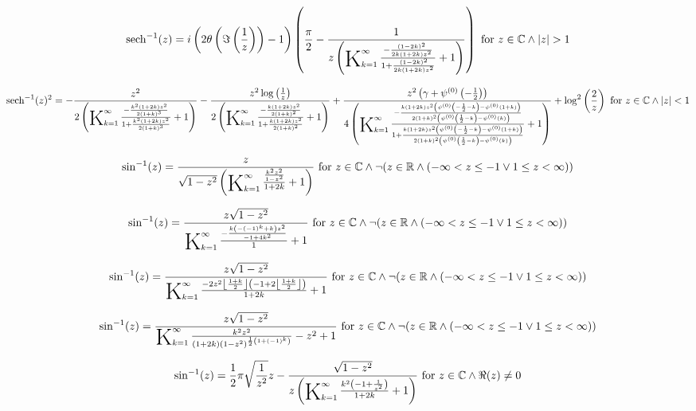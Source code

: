 \documentclass{article}
\newcommand{\bigK}{\mathop{\raisebox{-5pt}{\huge K}}}
\begin{document}
\[\text{sech}^{-1}(z)=i \left(2 \theta \left(\Im\left(\frac{1}{z}\right)\right)-1\right) \left(\frac{\pi }{2}-\frac{1}{z \left(\bigK_{k=1}^{\infty}\frac{-\frac{(1-2 k)^2}{2 k (1+2 k) z^2}}{1+\frac{(1-2 k)^2}{2 k (1+2 k) z^2}}+1\right)}\right)\text{ for }z\in \mathbb{C}\land \left| z\right| >1\] 

\[\text{sech}^{-1}(z)^2=-\frac{z^2}{2 \left(\bigK_{k=1}^{\infty}\frac{-\frac{k^2 (1+2 k) z^2}{2 (1+k)^3}}{1+\frac{k^2 (1+2 k) z^2}{2 (1+k)^3}}+1\right)}-\frac{z^2 \log \left(\frac{1}{z}\right)}{2 \left(\bigK_{k=1}^{\infty}\frac{-\frac{k (1+2 k) z^2}{2 (1+k)^2}}{1+\frac{k (1+2 k) z^2}{2 (1+k)^2}}+1\right)}+\frac{z^2 \left(\gamma +\psi ^{(0)}\left(-\frac{1}{2}\right)\right)}{4 \left(\bigK_{k=1}^{\infty}\frac{-\frac{k (1+2 k) z^2 \left(\psi ^{(0)}\left(-\frac{1}{2}-k\right)-\psi ^{(0)}(1+k)\right)}{2 (1+k)^2 \left(\psi ^{(0)}\left(\frac{1}{2}-k\right)-\psi ^{(0)}(k)\right)}}{1+\frac{k (1+2 k) z^2 \left(\psi ^{(0)}\left(-\frac{1}{2}-k\right)-\psi ^{(0)}(1+k)\right)}{2 (1+k)^2 \left(\psi ^{(0)}\left(\frac{1}{2}-k\right)-\psi ^{(0)}(k)\right)}}+1\right)}+\log ^2\left(\frac{2}{z}\right)\text{ for }z\in \mathbb{C}\land \left| z\right| <1\] 

\[\sin ^{-1}(z)=\frac{z}{\sqrt{1-z^2} \left(\bigK_{k=1}^{\infty}\frac{\frac{k^2 z^2}{1-z^2}}{1+2 k}+1\right)}\text{ for }z\in \mathbb{C}\land \neg (z\in \mathbb{R}\land (-\infty <z\leq -1\lor 1\leq z<\infty ))\] 

\[\sin ^{-1}(z)=\frac{z \sqrt{1-z^2}}{\bigK_{k=1}^{\infty}\frac{-\frac{k \left(-(-1)^k+k\right) z^2}{-1+4 k^2}}{1}+1}\text{ for }z\in \mathbb{C}\land \neg (z\in \mathbb{R}\land (-\infty <z\leq -1\lor 1\leq z<\infty ))\] 

\[\sin ^{-1}(z)=\frac{z \sqrt{1-z^2}}{\bigK_{k=1}^{\infty}\frac{-2 z^2 \left\lfloor \frac{1+k}{2}\right\rfloor  \left(-1+2 \left\lfloor \frac{1+k}{2}\right\rfloor \right)}{1+2 k}+1}\text{ for }z\in \mathbb{C}\land \neg (z\in \mathbb{R}\land (-\infty <z\leq -1\lor 1\leq z<\infty ))\] 

\[\sin ^{-1}(z)=\frac{z \sqrt{1-z^2}}{\bigK_{k=1}^{\infty}\frac{k^2 z^2}{(1+2 k) \left(1-z^2\right)^{\frac{1}{2} \left(1+(-1)^k\right)}}-z^2+1}\text{ for }z\in \mathbb{C}\land \neg (z\in \mathbb{R}\land (-\infty <z\leq -1\lor 1\leq z<\infty ))\] 

\[\sin ^{-1}(z)=\frac{1}{2} \pi  \sqrt{\frac{1}{z^2}} z-\frac{\sqrt{1-z^2}}{z \left(\bigK_{k=1}^{\infty}\frac{k^2 \left(-1+\frac{1}{z^2}\right)}{1+2 k}+1\right)}\text{ for }z\in \mathbb{C}\land \Re(z)\neq 0\] 
\end{document}
